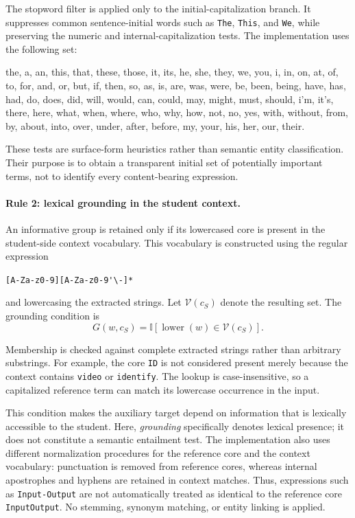 \documentclass{article} %
\begin{document}
The stopword filter is applied only to the initial-capitalization branch. It suppresses common sentence-initial words such as \texttt{The}, \texttt{This}, and \texttt{We}, while preserving the numeric and internal-capitalization tests. The implementation uses the following set:

\begin{tcolorbox}[
    colback=gray!5,
    colframe=black!45,
    title=Stopwords for the initial-capitalization rule,
    breakable,
    fontupper=\small
]
the, a, an, this, that, these, those, it, its, he, she, they, we,
you, i, in, on, at, of, to, for, and, or, but, if, then, so, as,
is, are, was, were, be, been, being, have, has, had, do, does,
did, will, would, can, could, may, might, must, should, i'm,
it's, there, here, what, when, where, who, why, how, not, no,
yes, with, without, from, by, about, into, over, under, after,
before, my, your, his, her, our, their.
\end{tcolorbox}

These tests are surface-form heuristics rather than semantic entity classification. Their purpose is to obtain a transparent initial set of potentially important terms, not to identify every content-bearing expression.

\paragraph{Rule 2: lexical grounding in the student context.}
An informative group is retained only if its lowercased core is present in the student-side context vocabulary. This vocabulary is constructed using the regular expression
\begin{center}
\verb|[A-Za-z0-9][A-Za-z0-9'\-]*|
\end{center}
and lowercasing the extracted strings. Let $\mathcal{V}(c_S)$ denote the resulting set. The grounding condition is
\begin{equation}
G(w,c_S)
=
\mathbb{I}\!\left[
\operatorname{lower}(w)\in\mathcal{V}(c_S)
\right].
\label{eq:focal_grounding}
\end{equation}

Membership is checked against complete extracted strings rather than arbitrary substrings. For example, the core \texttt{ID} is not considered present merely because the context contains \texttt{video} or \texttt{identify}. The lookup is case-insensitive, so a capitalized reference term can match its lowercase occurrence in the input.

This condition makes the auxiliary target depend on information that is lexically accessible to the student. Here, \emph{grounding} specifically denotes lexical presence; it does not constitute a semantic entailment test. The implementation also uses different normalization procedures for the reference core and the context vocabulary: punctuation is removed from reference cores, whereas internal apostrophes and hyphens are retained in context matches. Thus, expressions such as \texttt{Input-Output} are not automatically treated as identical to the reference core \texttt{InputOutput}. No stemming, synonym matching, or entity linking is applied.
\end{document}
